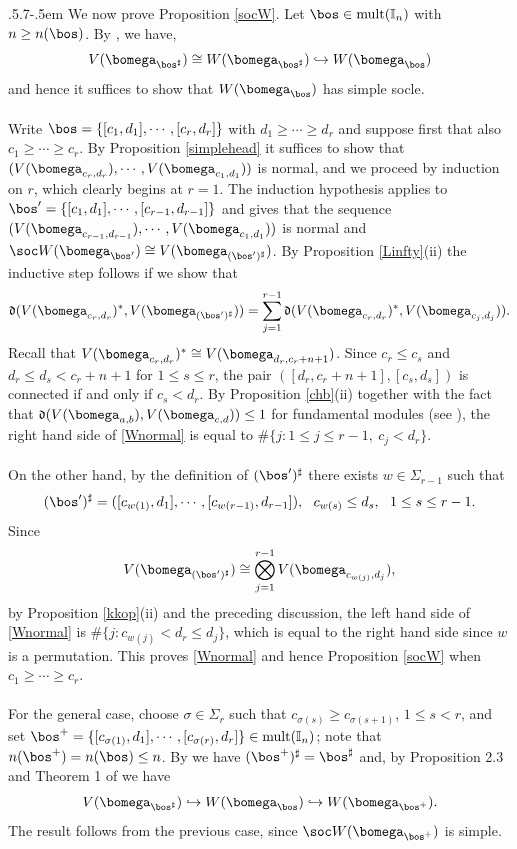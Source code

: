 \documentclass[11pt,reqno]{amsart}
\makeatletter
\theoremstyle{definition} \newtheorem*{defn}{Definition}
\theoremstyle{definition}
\numberwithin{equation}{section}
\newcommand{\lie}[1]{\mathfrak{#1}}
\def\subsection{\def\@secnumfont{\bfseries}\@startsection{subsection}{2}%
  {\parindent}{.5\linespacing\@plus.7\linespacing}{-.5em}%
  {\normalfont\bfseries}}
\def\mult{\operatorname{mult}}
\makeatother
\begin{document}
\subsection{}\label{socstd} We now prove Proposition \ref{socW}. Let $\bos\in{\rm mult}(\mathbb I_n)$ with $n\ge n(\bos)$. By \cite[Theorem 1]{BC25b},  we have,  $$V(\bomega_{\bos^\sharp})\cong W(\bomega_{\bos^\sharp})\hookrightarrow W(\bomega_\bos)$$ and hence it suffices to show that $W(\bomega_\bos)$ has simple socle. \\\\
Write $\bos=\{[c_1,d_1],\cdots,[c_r,d_r]\}$ with $d_1\ge\cdots\ge d_r$ and suppose first that also  $c_1\geq \cdots\geq c_r$. 
By Proposition \ref{simplehead} it suffices to show that $(V(\bomega_{c_r,d_r}),\cdots, V(\bomega_{c_1,d_1}))$ is normal, and we proceed by induction on $r$, which clearly begins at $r=1$. The induction hypothesis applies to $\bos'= \{[c_1,d_1],\cdots, [c_{r-1},d_{r-1}]\}$  and gives that the sequence
$(V(\bomega_{c_{r-1},d_{r-1}}),\cdots, V(\bomega_{c_1,d_1}))$ is normal and $\soc W(\bomega_{\bos'})\cong V(\bomega_{(\bos')^\sharp})$. By Proposition \ref{Linfty}(ii) the inductive step follows if we show that
\begin{equation}\label{Wnormal}\lie d (V(\bomega_{c_r,d_r})^*, V(\bomega_{(\bos')^\sharp})) = \sum_{j=1}^{r-1} \lie d (V(\bomega_{c_r,d_r})^*, V(\bomega_{c_j,d_j})).
\end{equation}
Recall that $V(\bomega_{c_r,d_r})^* \cong V(\bomega_{d_r,c_r+n+1})$. Since $c_r\leq c_s$ and $d_r\leq d_s<c_r+n+1$ for $1\leq s\leq r$, the pair $([d_r,c_r+n+1],[c_s,d_s])$ is connected if and only if $c_s<d_r$. By Proposition \ref{chb}(ii) together with the fact that $\lie d (V(\bomega_{a,b}),V(\bomega_{c,d}))\leq 1$ for fundamental modules (see \cite{AK97, DO94}), the right hand side of \eqref{Wnormal} is equal to $\#\{j: 1\leq j\leq r-1, \ c_j<d_r\}$.\\\\
On the other hand, by the definition of $(\bos')^\sharp$ there exists $w\in \Sigma_{r-1}$ such that
$$(\bos')^\sharp = ([c_{w(1)},d_1],\cdots, [c_{w(r-1)},d_{r-1}]), \ \ c_{w(s)}\leq d_s, \ \ 1\leq s\leq r-1.$$
 Since $$V(\bomega_{(\bos')^\sharp})\cong \bigotimes_{j=1}^{r-1} V(\bomega_{c_{w(j)},d_j}),$$
by Proposition \ref{kkop}(ii) and the preceding discussion, the left hand side of \eqref{Wnormal} is $\#\{j: c_{w(j)}<d_r\leq d_j\}$, which is equal to the right hand side since $w$ is a permutation. This proves \eqref{Wnormal} and hence Proposition \ref{socW} when $c_1\geq \cdots \geq c_r$. \\\\
For the general case, choose $\sigma\in\Sigma_r$  such that $c_{\sigma(s)}\ge c_{\sigma(s+1)}$, $1\le s<r$, and set $\bos^+=\{[c_{\sigma(1)},d_1],\cdots,[c_{\sigma(r)},d_r]\}\in \mult(\mathbb I_n)$; note that $n(\bos^+)=n(\bos)\leq n$. By \cite[Proposition 1.4.4]{BC25b} we have $(\bos^+)^\sharp =\bos^\sharp$ and, by Proposition  2.3 and Theorem 1 of \cite{BC25b} we have
$$V(\bomega_{\bos^\sharp})\hookrightarrow W(\bomega_\bos)\hookrightarrow W(\bomega_{\bos^+}).$$
The result follows from the previous case, since $\soc W(\bomega_{\bos^+})$ is simple. 
\end{document}
